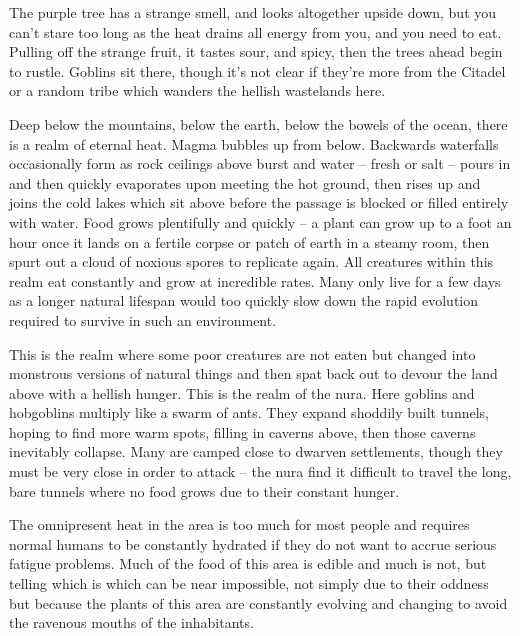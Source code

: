 \begin{multicols}{2}

\begin{boxtext}

	The purple tree has a strange smell, and looks altogether upside down, but you can't stare too long as the heat drains all energy from you, and you need to eat.
Pulling off the strange fruit, it tastes sour, and spicy, then the trees ahead begin to rustle.
Goblins sit there, though it's not clear if they're more from the Citadel or a random tribe which wanders the hellish wastelands here.

\end{boxtext}

Deep below the mountains, below the earth, below the bowels of the ocean, there is a realm of eternal heat.
Magma bubbles up from below.
Backwards waterfalls occasionally form as rock ceilings above burst and water -- fresh or salt -- pours in and then quickly evaporates upon meeting the hot ground, then rises up and joins the cold lakes which sit above before the passage is blocked or filled entirely with water.
Food grows plentifully and quickly -- a plant can grow up to a foot an hour once it lands on a fertile corpse or patch of earth in a steamy room, then spurt out a cloud of noxious spores to replicate again.
All creatures within this realm eat constantly and grow at incredible rates.
Many only live for a few days as a longer natural lifespan would too quickly slow down the rapid evolution required to survive in such an environment.

	This is the realm where some poor creatures are not eaten but changed into monstrous versions of natural things and then spat back out to devour the land above with a hellish hunger.  This is the realm of the nura.  Here goblins and hobgoblins multiply like a swarm of ants.  They expand shoddily built tunnels, hoping to find more warm spots, filling in caverns above, then those caverns inevitably collapse.  Many are camped close to dwarven settlements, though they must be very close in order to attack -- the nura find it difficult to travel the long, bare tunnels where no food grows due to their constant hunger.

	The omnipresent heat in the area is too much for most people and requires normal humans to be constantly hydrated if they do not want to accrue serious fatigue problems.  Much of the food of this area is edible and much is not, but telling which is which can be near impossible, not simply due to their oddness but because the plants of this area are constantly evolving and changing to avoid the ravenous mouths of the inhabitants.


\end{multicols}
